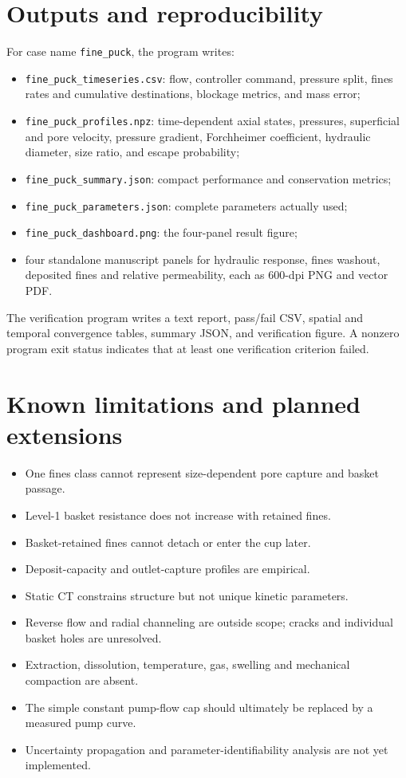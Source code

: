 \documentclass[11pt,a4paper]{article}
\newcommand{\code}[1]{\texttt{#1}}
\begin{document}
\section{Outputs and reproducibility}

For case name 
\code{fine\_puck}, the program writes:
\begin{itemize}
  \item 
  \code{fine\_puck\_timeseries.csv}: flow, controller command, pressure split,
  fines rates and cumulative destinations, blockage metrics, and mass error;
  \item 
  \code{fine\_puck\_profiles.npz}: time-dependent axial states, pressures,
  superficial and pore velocity, pressure gradient, Forchheimer coefficient,
  hydraulic diameter, size ratio, and escape probability;
  \item 
  \code{fine\_puck\_summary.json}: compact performance and conservation metrics;
  \item 
  \code{fine\_puck\_parameters.json}: complete parameters actually used;
  \item 
  \code{fine\_puck\_dashboard.png}: the four-panel result figure;
  \item four standalone manuscript panels for hydraulic response, fines
  washout, deposited fines and relative permeability, each as 600-dpi PNG and
  vector PDF.
\end{itemize}

The verification program writes a text report, pass/fail CSV, spatial and
temporal convergence tables, summary JSON, and verification figure. A nonzero
program exit status indicates that at least one verification criterion failed.

\section{Known limitations and planned extensions}

\begin{itemize}
  \item One fines class cannot represent size-dependent pore capture and basket passage.
  \item Level-1 basket resistance does not increase with retained fines.
  \item Basket-retained fines cannot detach or enter the cup later.
  \item Deposit-capacity and outlet-capture profiles are empirical.
  \item Static CT constrains structure but not unique kinetic parameters.
  \item Reverse flow and radial channeling are outside scope; cracks and individual basket holes are unresolved.
  \item Extraction, dissolution, temperature, gas, swelling and mechanical compaction are absent.
  \item The simple constant pump-flow cap should ultimately be replaced by a measured pump curve.
  \item Uncertainty propagation and parameter-identifiability analysis are not yet implemented.
\end{itemize}
\end{document}
